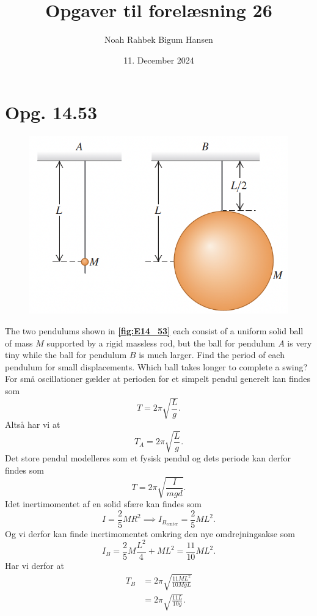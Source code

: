 \documentclass[12pt]{article}
\title{Opgaver til forelæsning 26}
\author{Noah Rahbek Bigum Hansen}
\date{11. December 2024}
\theoremstyle{definition}
\begin{document}
\maketitle

\section*{Opg. 14.53}
\begin{figure} [ht]
  \centering
  \caption{}
  \includegraphics[width=0.5\linewidth]{../figures/E14_53.png}
  \label{fig:E14_53}
\end{figure}
The two pendulums shown in \textbf{\autoref{fig:E14_53}} each consist of a uniform solid ball of mass $M$ supported by a rigid massless rod, but the ball for pendulum $A$ is very tiny while the ball for pendulum $B$ is much larger. Find the period of each pendulum for small displacements. Which ball takes longer to complete a swing? %
\bigbreak
For små oscillationer gælder at perioden for et simpelt pendul generelt kan findes som
\[ 
T = 2\pi \sqrt{\frac{L}{g}}
.\]
Altså har vi at
\[ 
  T_A = 2\pi \sqrt{\frac{L}{g}}
.\]
Det store pendul modelleres som et fysisk pendul og dets periode kan derfor findes som
\[ 
T = 2\pi \sqrt{\frac{I}{mgd}}
.\]
Idet inertimomentet af en solid sfære kan findes som
\[ 
I = \frac{2}{5} MR^2 \implies I_{B_{\text{center}}} = \frac{2}{5} M L^2
.\]
Og vi derfor kan finde inertimomentet omkring den nye omdrejningsakse som
\[ 
I_B = \frac{2}{5}M \frac{L^2}{4} + M L^2 = \frac{11}{10}ML^2
.\]
Har vi derfor at
\begin{align*}
  T_B &= 2\pi \sqrt{\frac{11 ML^2}{10 Mg L}} \\
      &= 2\pi \sqrt{\frac{11 L}{10 g}}
.\end{align*}
\end{document}
